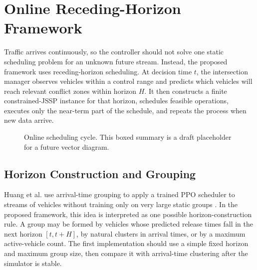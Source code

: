 \section{Online Receding-Horizon Framework}

Traffic arrives continuously, so the controller should not solve one static scheduling problem for an unknown future stream. Instead, the proposed framework uses receding-horizon scheduling. At decision time $t$, the intersection manager observes vehicles within a control range and predicts which vehicles will reach relevant conflict zones within horizon $H$. It then constructs a finite constrained-JSSP instance for that horizon, schedules feasible operations, executes only the near-term part of the schedule, and repeats the process when new data arrive.

\begin{figure}[t]
\centering
{}
\caption{Online scheduling cycle. This boxed summary is a draft placeholder for a future vector diagram.}
\label{fig:cycle}
\end{figure}

\subsection{Horizon Construction and Grouping}

Huang et al. use arrival-time grouping to apply a trained PPO scheduler to streams of vehicles without training only on very large static groups \cite{huang2023reinforcement}. In the proposed framework, this idea is interpreted as one possible horizon-construction rule. A group may be formed by vehicles whose predicted release times fall in the next horizon $[t,t+H]$, by natural clusters in arrival times, or by a maximum active-vehicle count. The first implementation should use a simple fixed horizon and maximum group size, then compare it with arrival-time clustering after the simulator is stable.

